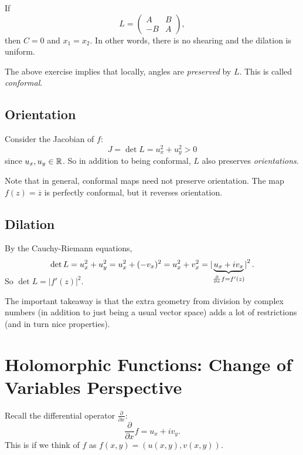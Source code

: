 \begin{tcolorbox}[title=Exercise]
  If
  \[
  L =
  \left(\begin{matrix}
      A & B \\
      -B & A
  \end{matrix}\right)
  ,\]
  then $C = 0$ and $x_1 = x_2$. In other words, there
  is no shearing and the dilation is uniform.
\end{tcolorbox}

The above exercise implies that locally, angles are
\textit{preserved} by $L$. This is called
\textit{conformal}.

\subsection{Orientation}
Consider the Jacobian of $f$:
\[
J = \det L = u_x^2 + u_y^2 > 0
\]
since $u_x, u_y \in \mathbb{R}$. So in addition to being
conformal, $L$ also preserves \textit{orientations}.

Note that in general, conformal maps need not preserve
orientation. The map $f(z) = \overline{z}$ is perfectly
conformal, but it reverses orientation.

\subsection{Dilation}
By the Cauchy-Riemann equations,
\[
\det L = u_x^2 + u_y^2 = u_x^2 + (-v_x)^2
= u_x^2 + v_x^2 = \left\lvert\smash[b]{\underbrace{u_x + iv_x}_{\frac{\partial}{\partial x} f = f'(z)}}\right\rvert^2
.\]
So $\det L = |f'(z)|^2$.

The important takeaway is that the extra geometry from
division by complex numbers (in addition to just being a
usual vector space) adds a lot of restrictions (and
in turn nice properties).

\section{Holomorphic Functions: Change of Variables Perspective}
Recall the differential operator
$\frac{\partial}{\partial x}$:
\[
\frac{\partial}{\partial x} f = u_x + iv_y
.\]
This is if we think of $f$ as
$f(x, y) = (u(x, y), v(x, y))$.

